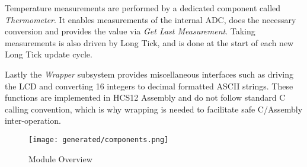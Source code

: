 Temperature measurements are performed by a dedicated component called \emph{Thermometer}. It enables measurements of the internal ADC, does the necessary conversion and provides the value via \emph{Get Last Measurement}. Taking measurements is also driven by Long Tick, and is done at the start of each new Long Tick update cycle.

Lastly the \emph{Wrapper} subsystem provides miscellaneous interfaces such as driving the LCD and converting \SI{16}{\bit} integers to decimal formatted ASCII strings. These functions are implemented in HCS12 Assembly and do not follow standard C calling convention, which is why wrapping is needed to facilitate safe C/Assembly inter-operation.

\begin{figure}[ht]
    \centering
    \texttt{[image: generated/components.png]}
    \caption{Module Overview}\label{fig:module_overview}
\end{figure}
